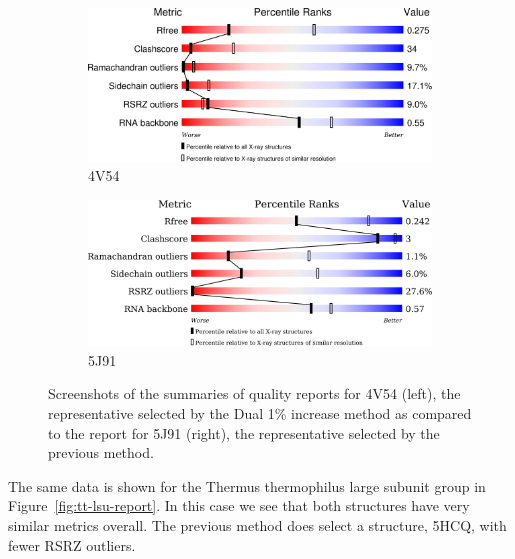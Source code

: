 \begin{figure}
  \begin{subfigure}[b]{0.5\textwidth}
    \includegraphics[width=\linewidth]{chapter-4/figs/quality-reports/4V54}
    \caption{4V54}
    \label{fig:4V54-quality}
  \end{subfigure}
  \begin{subfigure}[b]{0.5\textwidth}
    \includegraphics[width=\linewidth]{chapter-4/figs/quality-reports/5J91}
    \caption{5J91}
    \label{fig:5J91-quality}
  \end{subfigure}
  \caption{Screenshots of the summaries of quality reports for 4V54 (left), the
    representative selected by the Dual 1\% increase method as compared to the
    report for 5J91 (right), the representative selected by the previous
  method.}
  \label{fig:ec-lsu-report}
\end{figure}

The same data is shown for the Thermus thermophilus large subunit group in
Figure~\ref{fig:tt-lsu-report}. In this case we see that both structures have very
similar metrics overall. The previous method does select a structure, 5HCQ, with
fewer RSRZ outliers.

